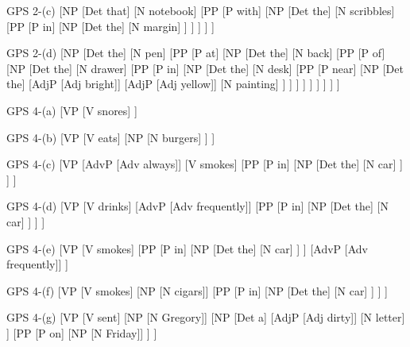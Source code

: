 \documentclass{article}
\begin{document}
\bigskip
\noindent
\begin{gpstree}[\textwidth]{GPS 2-(c)}
[NP 
  [Det that]
  [N notebook]
  [PP 
    [P with]
    [NP
      [Det the]
      [N scribbles]
      [PP 
        [P in]
        [NP
          [Det the]
          [N margin]
        ]
      ]
    ]
  ]
]
\end{gpstree}

\bigskip
\noindent
\begin{gpstree}[\textwidth]{GPS 2-(d)}
[NP 
  [Det the]
  [N pen]
  [PP
    [P at]
    [NP 
      [Det the]
      [N back]
      [PP
        [P of]
        [NP
          [Det the]
          [N drawer]
          [PP
            [P in]
            [NP
              [Det the]
              [N desk]
              [PP
                [P near]
                [NP
                  [Det the]
                  [AdjP [Adj bright]]
                  [AdjP [Adj yellow]]
                  [N painting]
                ]
              ]
            ]
          ]
        ]
      ]
    ]
  ]
]
\end{gpstree}

\newpage
\noindent
\begin{gpstree}{GPS 4-(a)}
[VP
  [V snores]
]
\end{gpstree}%
\hfill
\begin{gpstree}{GPS 4-(b)}
[VP
  [V eats]
  [NP 
    [N burgers]
  ]
]
\end{gpstree} 

\bigskip
\noindent
\begin{gpstree}{GPS 4-(c)}
[VP
  [AdvP [Adv always]]
  [V smokes]
  [PP
    [P in]
    [NP
      [Det the]
      [N car]
    ]
  ]
]
\end{gpstree}%
\hfill
\begin{gpstree}{GPS 4-(d)}
[VP
  [V drinks]
  [AdvP [Adv frequently]]
  [PP
    [P in]
    [NP
      [Det the]
      [N car]
    ]
  ]
]
\end{gpstree}

\bigskip
\noindent
\begin{gpstree}{GPS 4-(e)}
[VP
  [V smokes]
  [PP
    [P in]
    [NP
      [Det the]
      [N car]
    ]
  ]
  [AdvP [Adv frequently]]
]
\end{gpstree}%
\hfill
\begin{gpstree}{GPS 4-(f)}
[VP
  [V smokes]
  [NP [N cigars]]
  [PP
    [P in]
    [NP
      [Det the]
      [N car]
    ]
  ]
]
\end{gpstree}

\bigskip
\noindent
\begin{gpstree}{GPS 4-(g)}
[VP
  [V sent]
  [NP [N Gregory]]
  [NP 
    [Det a]
    [AdjP [Adj dirty]]
    [N letter]
  ]
  [PP
    [P on]
    [NP [N Friday]]
  ]
]
\end{gpstree}
\end{document}

